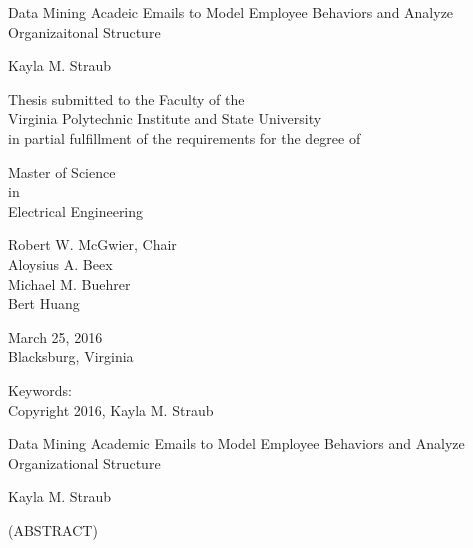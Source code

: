 \documentclass[12pt]{report}
\begin{document}
\thispagestyle{empty}
\begin{center}

{\Large 
Data Mining Acadeic Emails to Model Employee Behaviors and Analyze Organizaitonal Structure
}

\vfill

Kayla M. Straub

\vfill

Thesis submitted to the Faculty of the \\
Virginia Polytechnic Institute and State University \\
in partial fulfillment of the requirements for the degree of

\vfill

Master of Science \\
in \\
Electrical Engineering
\vfill

Robert W. McGwier, Chair \\
Aloysius A. Beex\\
Michael M. Buehrer\\
Bert Huang

\vfill

March 25, 2016 \\
Blacksburg, Virginia

\vfill

Keywords: 
\\
Copyright 2016, Kayla M. Straub

\end{center}

\pagebreak

\thispagestyle{empty}
\begin{center}

{\large Data Mining Academic Emails to Model Employee Behaviors and Analyze Organizational Structure}

\vfill

Kayla M. Straub

\vfill

(ABSTRACT)

\vfill

\end{center}
\end{document}
